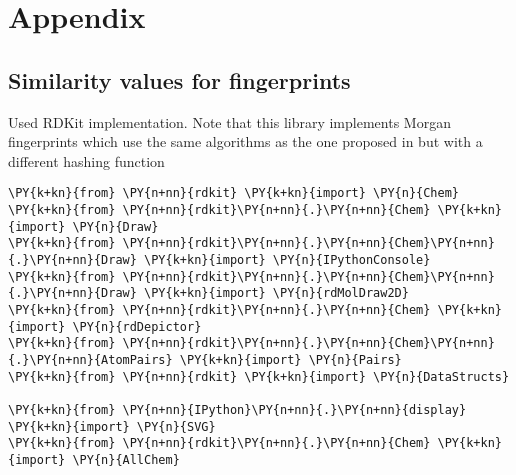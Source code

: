 
	
	






\appendix
\section*{Appendix}


\subsection{Similarity values for fingerprints}
\label{sec:a_sim}
Used RDKit\citep{rdkit} implementation. Note that this library implements Morgan fingerprints which use the same algorithms as the one proposed in \citep{ECFP} but with a different hashing function
    
    
    
    
    \hypersetup{
    	breaklinks=true,  %
    	colorlinks=true,
    	urlcolor=urlcolor,
    	linkcolor=linkcolor,
    	citecolor=citecolor,
    }
    \footnotesize
    

\begin{tcolorbox}[breakable, size=fbox, boxrule=1pt, pad at break*=1mm,colback=cellbackground, colframe=cellborder]
\begin{Verbatim}[commandchars=\\\{\}]
\PY{k+kn}{from} \PY{n+nn}{rdkit} \PY{k+kn}{import} \PY{n}{Chem}
\PY{k+kn}{from} \PY{n+nn}{rdkit}\PY{n+nn}{.}\PY{n+nn}{Chem} \PY{k+kn}{import} \PY{n}{Draw}
\PY{k+kn}{from} \PY{n+nn}{rdkit}\PY{n+nn}{.}\PY{n+nn}{Chem}\PY{n+nn}{.}\PY{n+nn}{Draw} \PY{k+kn}{import} \PY{n}{IPythonConsole}
\PY{k+kn}{from} \PY{n+nn}{rdkit}\PY{n+nn}{.}\PY{n+nn}{Chem}\PY{n+nn}{.}\PY{n+nn}{Draw} \PY{k+kn}{import} \PY{n}{rdMolDraw2D}
\PY{k+kn}{from} \PY{n+nn}{rdkit}\PY{n+nn}{.}\PY{n+nn}{Chem} \PY{k+kn}{import} \PY{n}{rdDepictor}
\PY{k+kn}{from} \PY{n+nn}{rdkit}\PY{n+nn}{.}\PY{n+nn}{Chem}\PY{n+nn}{.}\PY{n+nn}{AtomPairs} \PY{k+kn}{import} \PY{n}{Pairs}
\PY{k+kn}{from} \PY{n+nn}{rdkit} \PY{k+kn}{import} \PY{n}{DataStructs}

\PY{k+kn}{from} \PY{n+nn}{IPython}\PY{n+nn}{.}\PY{n+nn}{display} \PY{k+kn}{import} \PY{n}{SVG}
\PY{k+kn}{from} \PY{n+nn}{rdkit}\PY{n+nn}{.}\PY{n+nn}{Chem} \PY{k+kn}{import} \PY{n}{AllChem}
\end{Verbatim}
\end{tcolorbox}

